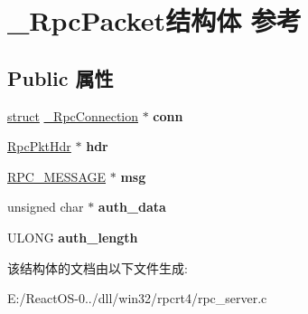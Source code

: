 \hypertarget{struct___rpc_packet}{}\section{\+\_\+\+Rpc\+Packet结构体 参考}
\label{struct___rpc_packet}
\subsection*{Public 属性}
\begin{DoxyCompactItemize}
\item 
\mbox{\label{struct___rpc_packet_a7df48d2779cbc3722382d390520ca0d4}} 
\hyperlink{interfacestruct}{struct} \hyperlink{struct___rpc_connection}{\+\_\+\+Rpc\+Connection} $\ast$ {\bfseries conn}
\item 
\mbox{\label{struct___rpc_packet_ad8695c08b883b35a93134a7feb8d39d1}} 
\hyperlink{union_rpc_pkt_hdr}{Rpc\+Pkt\+Hdr} $\ast$ {\bfseries hdr}
\item 
\mbox{\label{struct___rpc_packet_a89e93ed88b89112357aa280542ea155d}} 
\hyperlink{struct___r_p_c___m_e_s_s_a_g_e}{R\+P\+C\+\_\+\+M\+E\+S\+S\+A\+GE} $\ast$ {\bfseries msg}
\item 
\mbox{\label{struct___rpc_packet_af1c29f4814aab1dea31a8346c7a04ebb}} 
unsigned char $\ast$ {\bfseries auth\+\_\+data}
\item 
\mbox{\label{struct___rpc_packet_a1633df20a926afda8c1d81cdeda90a93}} 
U\+L\+O\+NG {\bfseries auth\+\_\+length}
\end{DoxyCompactItemize}


该结构体的文档由以下文件生成\+:\begin{DoxyCompactItemize}
\item 
E\+:/\+React\+O\+S-\/0../dll/win32/rpcrt4/rpc\+\_\+server.\+c\end{DoxyCompactItemize}
